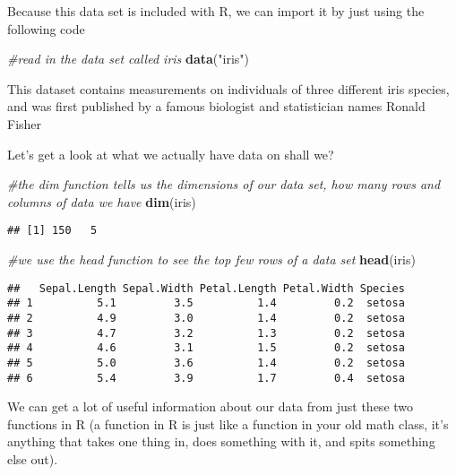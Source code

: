\documentclass[
]{article}
\newenvironment{Shaded}{\begin{snugshade}}{\end{snugshade}}
\newcommand{\CommentTok}[1]{\textcolor[rgb]{0.56,0.35,0.01}{\textit{#1}}}
\newcommand{\KeywordTok}[1]{\textcolor[rgb]{0.13,0.29,0.53}{\textbf{#1}}}
\newcommand{\NormalTok}[1]{#1}
\newcommand{\StringTok}[1]{\textcolor[rgb]{0.31,0.60,0.02}{#1}}
\begin{document}
Because this data set is included with R, we can import it by just using
the following code

\begin{Shaded}
\begin{Highlighting}[]
\CommentTok{\#read in the data set called iris}
\KeywordTok{data}\NormalTok{(}\StringTok{"iris"}\NormalTok{)}
\end{Highlighting}
\end{Shaded}

This dataset contains measurements on individuals of three different
iris species, and was first published by a famous biologist and
statistician names Ronald Fisher

Let's get a look at what we actually have data on shall we?

\begin{Shaded}
\begin{Highlighting}[]
\CommentTok{\#the dim function tells us the dimensions of our data set, how many rows and columns of data we have}
\KeywordTok{dim}\NormalTok{(iris)}
\end{Highlighting}
\end{Shaded}

\begin{verbatim}
## [1] 150   5
\end{verbatim}

\begin{Shaded}
\begin{Highlighting}[]
\CommentTok{\#we use the head function to see the top few rows of a data set}
\KeywordTok{head}\NormalTok{(iris)}
\end{Highlighting}
\end{Shaded}

\begin{verbatim}
##   Sepal.Length Sepal.Width Petal.Length Petal.Width Species
## 1          5.1         3.5          1.4         0.2  setosa
## 2          4.9         3.0          1.4         0.2  setosa
## 3          4.7         3.2          1.3         0.2  setosa
## 4          4.6         3.1          1.5         0.2  setosa
## 5          5.0         3.6          1.4         0.2  setosa
## 6          5.4         3.9          1.7         0.4  setosa
\end{verbatim}

We can get a lot of useful information about our data from just these
two functions in R (a function in R is just like a function in your old
math class, it's anything that takes one thing in, does something with
it, and spits something else out).
\end{document}
